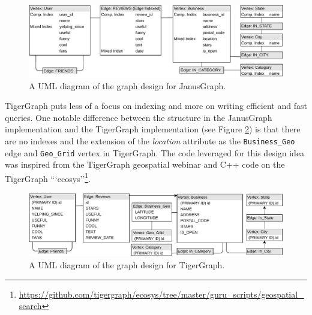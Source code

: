 \begin{figure}[h]
    \centering
    \includegraphics[width=16cm]{img/schema/yelpJanus.pdf}
    \caption{A UML diagram of the graph design for JanusGraph.}
    \label{fig:janusgraph-design}
\end{figure}

TigerGraph puts less of a focus on indexing and more on writing efficient and fast queries. One notable difference between the structure in the JanusGraph implementation and the TigerGraph implementation (see Figure \ref{fig:tigergraph-design}) is that there are no indexes and the extension of the \emph{location} attribute as the \texttt{Business\_Geo} edge and \texttt{Geo\_Grid} vertex in TigerGraph. The code leveraged for this design idea was inspired from the TigerGraph geospatial webinar \cite{graphgurus} and C++ code on the TigerGraph ```ecosys''\footnote{\url{https://github.com/tigergraph/ecosys/tree/master/guru\_scripts/geospatial\_search}}.

\begin{figure}[h]
    \centering
    \includegraphics[width=16cm]{img/schema/yelpTiger.pdf}
    \caption{A UML diagram of the graph design for TigerGraph.}
    \label{fig:tigergraph-design}
\end{figure}

